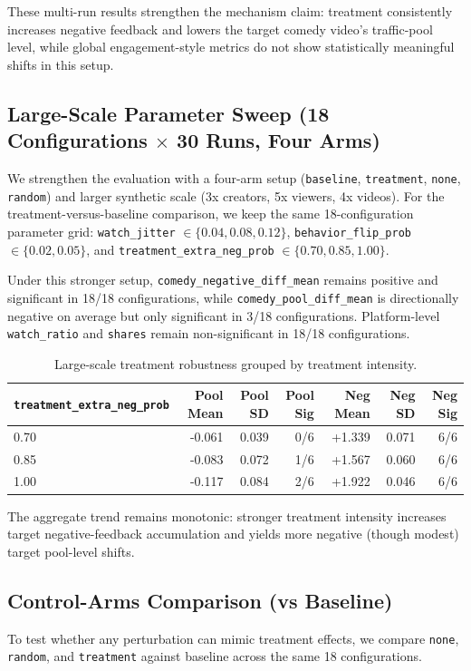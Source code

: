 \documentclass[11pt]{article}
\begin{document}
These multi-run results strengthen the mechanism claim: treatment consistently
increases negative feedback and lowers the target comedy video's traffic-pool
level, while global engagement-style metrics do not show statistically
meaningful shifts in this setup.

\subsection{Large-Scale Parameter Sweep (18 Configurations $\times$ 30 Runs, Four Arms)}
We strengthen the evaluation with a four-arm setup (\texttt{baseline},
\texttt{treatment}, \texttt{none}, \texttt{random}) and larger synthetic scale
(3x creators, 5x viewers, 4x videos). For the treatment-versus-baseline
comparison, we keep the same 18-configuration parameter grid:
\texttt{watch\_jitter} $\in \{0.04,0.08,0.12\}$,
\texttt{behavior\_flip\_prob} $\in \{0.02,0.05\}$, and
\texttt{treatment\_extra\_neg\_prob} $\in \{0.70,0.85,1.00\}$.

Under this stronger setup, \texttt{comedy\_negative\_diff\_mean} remains
positive and significant in 18/18 configurations, while
\texttt{comedy\_pool\_diff\_mean} is directionally negative on average but only
significant in 3/18 configurations. Platform-level \texttt{watch\_ratio} and
\texttt{shares} remain non-significant in 18/18 configurations.

\begin{table}[h]
\centering
\begin{tabular}{lrrrrrr}
\toprule
\texttt{treatment\_extra\_neg\_prob} & Pool Mean & Pool SD & Pool Sig & Neg Mean & Neg SD & Neg Sig \\
\midrule
0.70 & -0.061 & 0.039 & 0/6 & +1.339 & 0.071 & 6/6 \\
0.85 & -0.083 & 0.072 & 1/6 & +1.567 & 0.060 & 6/6 \\
1.00 & -0.117 & 0.084 & 2/6 & +1.922 & 0.046 & 6/6 \\
\bottomrule
\end{tabular}
\caption{Large-scale treatment robustness grouped by treatment intensity.}
\label{tab:batch-tn-summary}
\end{table}

The aggregate trend remains monotonic: stronger treatment intensity increases
target negative-feedback accumulation and yields more negative (though modest)
target pool-level shifts.

\subsection{Control-Arms Comparison (vs Baseline)}
To test whether any perturbation can mimic treatment effects, we compare
\texttt{none}, \texttt{random}, and \texttt{treatment} against baseline across
the same 18 configurations.
\end{document}
